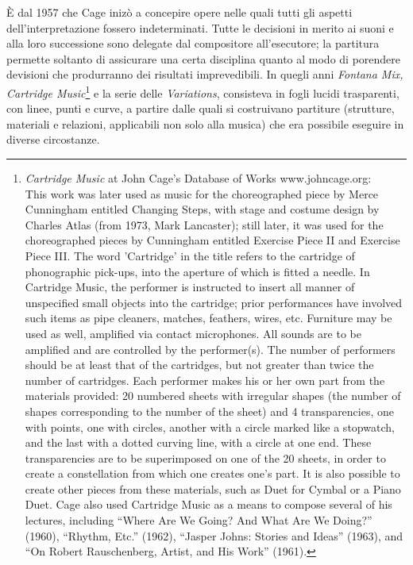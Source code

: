 \documentclass[%
			   a4paper,
			   twoside
			   ]{book}
\begin{document}
\begin{multicols}{2}
È dal 1957 che Cage inizò a concepire opere nelle quali tutti gli aspetti
dell'interpretazione fossero indeterminati. Tutte le decisioni in merito ai
suoni e alla loro successione sono delegate dal compositore all'esecutore;
la partitura permette soltanto di assicurare una certa disciplina quanto al
modo di porendere devisioni che produrranno dei risultati imprevedibili. In quegli
anni \emph{Fontana Mix, Cartridge Music}\footnote{\emph{Cartridge
Music} at John Cage's Database of Works www.johncage.org: \\ This work was later used as music for the choreographed piece by Merce Cunningham
entitled Changing Steps, with stage and costume design by Charles Atlas (from 1973,
Mark Lancaster); still later, it was used for the choreographed pieces by
Cunningham entitled Exercise Piece II and Exercise Piece III.
The word 'Cartridge' in the title refers to the cartridge of phonographic
pick-ups, into the aperture of which is fitted a needle. In Cartridge Music,
the performer is instructed to insert all manner of unspecified small objects
into the cartridge; prior performances have involved such items as pipe cleaners,
matches, feathers, wires, etc. Furniture may be used as well, amplified via
contact microphones. All sounds are to be amplified and are controlled by the
performer(s). The number of performers should be at least that of the cartridges,
but not greater than twice the number of cartridges. Each performer makes his or
her own part from the materials provided: 20 numbered sheets with irregular
shapes (the number of shapes corresponding to the number of the sheet) and 4
transparencies, one with points, one with circles, another with a circle marked
like a stopwatch, and the last with a dotted curving line, with a circle at one
end. These transparencies are to be superimposed on one of the 20 sheets, in
order to create a constellation from which one creates one's part. It is also
possible to create other pieces from these materials, such as Duet for Cymbal
or a Piano Duet. Cage also used Cartridge Music as a means to compose several
of his lectures, including “Where Are We Going? And What Are We Doing?” (1960),
“Rhythm, Etc.” (1962), “Jasper Johns: Stories and Ideas” (1963), and
“On Robert Rauschenberg, Artist, and His Work” (1961).} e la serie delle \emph{Variations},
consisteva in fogli lucidi trasparenti, con linee, punti e curve, a partire dalle
quali si costruivano partiture (strutture, materiali e relazioni, applicabili non
solo alla musica) che era possibile eseguire in diverse circostanze.


\end{multicols}
\end{document}
